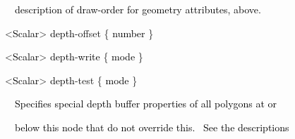 \documentclass[a4paper]{article}
\newcommand\textstyleOOoComputerKeyWord[1]{\textrm{\textcolor[rgb]{0.0,0.0,0.5019608}{#1}}}
\newcommand\textstyleOOoAssemblerSpecialChar[1]{\textrm{\textcolor[rgb]{0.0,0.5019608,0.0}{#1}}}
\newcommand\textstyleOOoAssemblerIdent[1]{\textrm{\textcolor{black}{#1}}}
\newcommand\textstyleOOoAssemblerDirective[1]{\textrm{\textcolor[rgb]{0.0,0.5019608,1.0}{#1}}}
\newcommand\textstyleOOoAssemblerInstruction[1]{\textrm{\textcolor[rgb]{0.0,0.0,0.49803922}{#1}}}
\begin{document}
{\color{black}
\textstyleOOoComputerKeyWord{\textcolor{black}{\ \ \ \ description of draw-order for geometry attributes, above.}}}


\bigskip

{\color{black}
\textstyleOOoComputerKeyWord{\textcolor{black}{\ \ }}\textstyleOOoAssemblerSpecialChar{{\textless}}\textstyleOOoAssemblerIdent{Scalar}\textstyleOOoAssemblerSpecialChar{{\textgreater}}\textstyleOOoComputerKeyWord{\textcolor{black}{
}}\textstyleOOoAssemblerIdent{depth}\textstyleOOoAssemblerSpecialChar{{}-}\textstyleOOoAssemblerDirective{offset}\textstyleOOoComputerKeyWord{\textcolor{black}{
}}\textstyleOOoAssemblerSpecialChar{\{}\textstyleOOoComputerKeyWord{\textcolor{black}{
}}\textstyleOOoAssemblerIdent{number}\textstyleOOoComputerKeyWord{\textcolor{black}{
}}\textstyleOOoAssemblerSpecialChar{\}}}

{\color{black}
\textstyleOOoComputerKeyWord{\textcolor{black}{\ \ }}\textstyleOOoAssemblerSpecialChar{{\textless}}\textstyleOOoAssemblerIdent{Scalar}\textstyleOOoAssemblerSpecialChar{{\textgreater}}\textstyleOOoComputerKeyWord{\textcolor{black}{
}}\textstyleOOoAssemblerIdent{depth}\textstyleOOoAssemblerSpecialChar{{}-}\textstyleOOoAssemblerIdent{write}\textstyleOOoComputerKeyWord{\textcolor{black}{
}}\textstyleOOoAssemblerSpecialChar{\{}\textstyleOOoComputerKeyWord{\textcolor{black}{
}}\textstyleOOoAssemblerIdent{mode}\textstyleOOoComputerKeyWord{\textcolor{black}{
}}\textstyleOOoAssemblerSpecialChar{\}}}

{\color{black}
\textstyleOOoComputerKeyWord{\textcolor{black}{\ \ }}\textstyleOOoAssemblerSpecialChar{{\textless}}\textstyleOOoAssemblerIdent{Scalar}\textstyleOOoAssemblerSpecialChar{{\textgreater}}\textstyleOOoComputerKeyWord{\textcolor{black}{
}}\textstyleOOoAssemblerIdent{depth}\textstyleOOoAssemblerSpecialChar{{}-}\textstyleOOoAssemblerInstruction{test}\textstyleOOoComputerKeyWord{\textcolor{black}{
}}\textstyleOOoAssemblerSpecialChar{\{}\textstyleOOoComputerKeyWord{\textcolor{black}{
}}\textstyleOOoAssemblerIdent{mode}\textstyleOOoComputerKeyWord{\textcolor{black}{
}}\textstyleOOoAssemblerSpecialChar{\}}}


\bigskip

{\color{black}
\textstyleOOoComputerKeyWord{\textcolor{black}{\ \ \ \ Specifies special depth buffer properties of all polygons at
or}}}

{\color{black}
\textstyleOOoComputerKeyWord{\textcolor{black}{\ \ \ \ below this node that do not override this. \ See the
descriptions}}}
\end{document}
